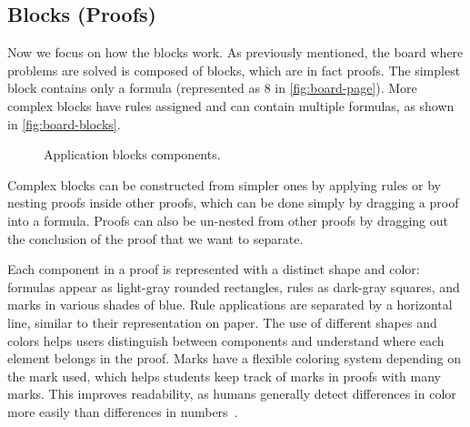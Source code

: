\subsection{Blocks (Proofs)}
Now we focus on how the blocks work. As previously mentioned, the board where problems are solved is composed of blocks, which are in fact proofs. The simplest block contains only a formula (represented as 8 in \autoref{fig:board-page}). More complex blocks have rules assigned and can contain multiple formulas, as shown in \autoref{fig:board-blocks}.

\begin{figure}[h]
    \centering
    \caption{Application blocks components.}
    \label{fig:board-blocks}
\end{figure}

Complex blocks can be constructed from simpler ones by applying rules or by nesting proofs inside other proofs, which can be done simply by dragging a proof into a formula. Proofs can also be un-nested from other proofs by dragging out the conclusion of the proof that we want to separate.

Each component in a proof is represented with a distinct shape and color: formulas appear as light-gray rounded rectangles, rules as dark-gray squares, and marks in various shades of blue. Rule applications are separated by a horizontal line, similar to their representation on paper. The use of different shapes and colors helps users distinguish between components and understand where each element belongs in the proof. Marks have a flexible coloring system depending on the mark used, which helps students keep track of marks in proofs with many marks. This improves readability, as humans generally detect differences in color more easily than differences in numbers~\cite{color_study}.


